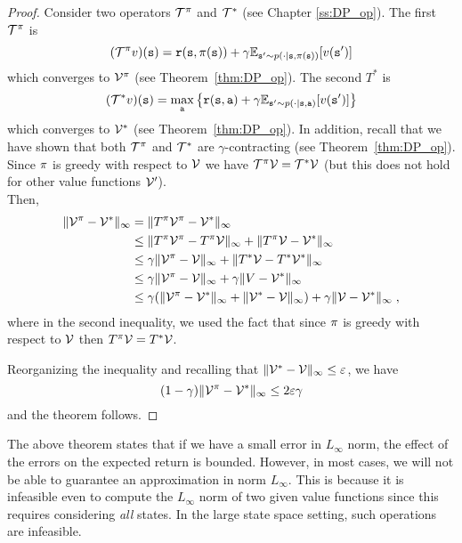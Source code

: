 \begin{proof}
Consider two operators $\mathcal{T}^\pi$ and $\mathcal{T}^*$ (see
Chapter \ref{ss:DP_op}). The first $\mathcal{T}^\pi$ is
\[
(\mathcal{T}^\pi v)({\tt s})={\tt r}({\tt s},\pi({\tt s}))+\gamma
\mathbb{E}_{{\tt s}'\sim p(\cdot|{\tt s},\pi({\tt s}))}[v({\tt s}')]
\]
which converges to $\mathcal{V}^\pi$ (see Theorem~\ref{thm:DP_op}).
The second $T^*$ is
\[
(\mathcal{T}^* v)({\tt s})=\max_{\tt a}\left\{{\tt r}({\tt s},{\tt a})+\gamma
\mathbb{E}_{{\tt s}'\sim p(\cdot|{\tt s},{\tt a})}[v({\tt s}')] \right\}
\]
which converges to $\mathcal{V}^*$ (see Theorem~\ref{thm:DP_op}).
In addition, recall that we have shown that both
$\mathcal{T}^\pi$ and $\mathcal{T}^*$ are $\gamma$-contracting (see
Theorem~\ref{thm:DP_op}).\\
Since $\pi$ is greedy with respect to $\mathcal{V}$ we have
$\mathcal{T}^\pi \mathcal{V}=\mathcal{T}^* \mathcal{V}$ (but this does not hold for
other value functions $\mathcal{V}'$).\\
Then,
\begin{align*}
\|\mathcal{V}^\pi-\mathcal{V}^*\|_\infty &= \|T^\pi \mathcal{V}^\pi - \mathcal{V}^*\|_\infty\\
&\leq \|T^\pi \mathcal{V}^\pi -T^\pi \mathcal{V}\|_\infty +\|T^\pi \mathcal{V} - \mathcal{V}^*\|_\infty\\
&\leq \gamma\| \mathcal{V}^\pi - \mathcal{V}\|_\infty +\|T^* \mathcal{V} - T^*\mathcal{V}^*\|_\infty\\
&\leq \gamma\| \mathcal{V}^\pi - \mathcal{V}\|_\infty +\gamma\| V - \mathcal{V}^*\|_\infty\\
&\leq \gamma(\| \mathcal{V}^\pi - \mathcal{V}^*\|_\infty+ \|\mathcal{V}^*-\mathcal{V}\|_\infty ) +\gamma\| \mathcal{V} - \mathcal{V}^*\|_\infty\;,
\end{align*}
where in the second inequality, we used the fact that since
$\pi$ is greedy with respect to $\mathcal{V}$ then $T^\pi \mathcal{V}=T^* \mathcal{V}$.

Reorganizing the inequality and recalling that
$\|\mathcal{V}^*-\mathcal{V}\|_\infty\leq \varepsilon$, we have
\[
(1-\gamma)\|\mathcal{V}^\pi-\mathcal{V}^*\|_\infty \leq 2\varepsilon\gamma
\]
and the theorem follows.
\end{proof}

The above theorem states that if we have a small error in
$L_\infty$ norm, the effect of the errors on the expected return is
bounded. However, in most cases, we will not be able to guarantee an
approximation in norm $L_\infty$. This is because it is infeasible even
to compute the $L_\infty$ norm of two given value functions since
this requires considering {\em all} states. In the large state space
setting, such operations are infeasible.

